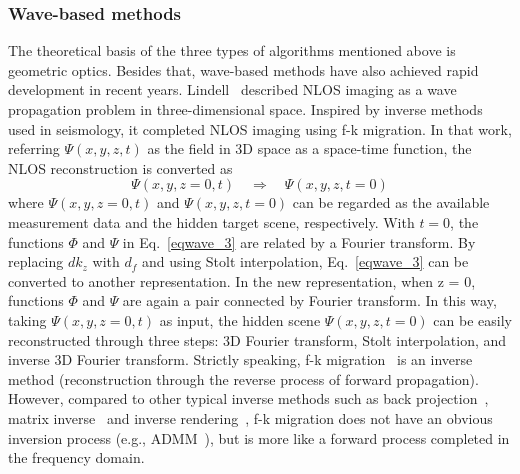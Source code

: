\subsubsection{Wave-based methods}
\label{sec:waveBased}
The theoretical basis of the three types of algorithms mentioned above is geometric optics. Besides that, wave-based methods have also achieved rapid development in recent years.
Lindell \etal~described NLOS imaging as a wave propagation problem in three-dimensional space. Inspired by inverse methods used in seismology, it completed NLOS imaging using f-k migration\cite{Lindell:2019:Wave}. In that work, referring $\Psi(x,y,z,t)$ as the field in 3D space as a space-time function, the NLOS reconstruction is converted as 
\begin{equation}
    \Psi(x, y, z=0, t) \quad \Rightarrow \quad \Psi(x, y, z, t=0)
\end{equation}
where $\Psi(x, y, z=0, t)$ and $\Psi(x, y, z, t=0)$ can be regarded as the available measurement data and the hidden target scene, respectively. 
With $t=0$, the functions $\Phi$ and $\Psi$ in Eq.~\ref{eqwave_3} are related by a Fourier transform. By replacing $dk_z$ with $d_f$ and using Stolt interpolation, Eq.~\ref{eqwave_3} can be converted to another representation. In the new representation, when z = 0, functions $\Phi$ and $\Psi$ are again a pair connected by Fourier transform. In this way, taking $\Psi(x, y, z=0, t)$ as input, the hidden scene $\Psi(x, y, z , t=0)$ can be easily reconstructed through three steps: 3D Fourier transform, Stolt interpolation, and inverse 3D Fourier transform. Strictly speaking, f-k migration~\cite{Lindell:2019:Wave} is an inverse method (reconstruction through the reverse process of forward propagation). However, compared to other typical inverse methods such as back projection~\cite{arellanoFastBackprojectionNonline2017,veltenRecoveringThreedimensionalShape2012}, matrix inverse~\cite{heideDiffuseMirrors3D2014} and inverse rendering~\cite{tsaiVolumetricAlbedoSurface2019}, f-k migration does not have an obvious inversion process (e.g., ADMM~\cite{otooleConfocalNonlineofsightImaging2018}), but is more like a forward process completed in the frequency domain.


